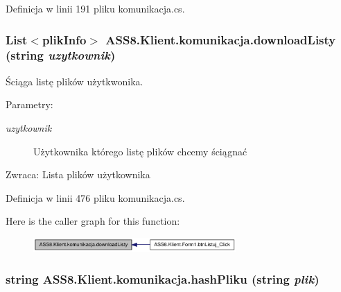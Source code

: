 Definicja w linii 191 pliku komunikacja.cs.\hypertarget{a00013_9ca2f36e9df9288ff32c44e789b0e576}{
\subsubsection[{downloadListy}]{\setlength{\rightskip}{0pt plus 5cm}List$<${\bf plikInfo}$>$ ASS8.Klient.komunikacja.downloadListy (string {\em uzytkownik})}}
\label{d7/dd4/a00013_9ca2f36e9df9288ff32c44e789b0e576}


Ściąga listę plików użytkwonika. 

\begin{Desc}
\item[Parametry:]
\begin{description}
\item[{\em uzytkownik}]Użytkownika którego listę plików chcemy ściągnać\end{description}
\end{Desc}
\begin{Desc}
\item[Zwraca:]Lista plików użytkownika\end{Desc}


Definicja w linii 476 pliku komunikacja.cs.

Here is the caller graph for this function:\nopagebreak
\begin{figure}[H]
\begin{center}
\leavevmode
\includegraphics[width=220pt]{d7/dd4/a00013_9ca2f36e9df9288ff32c44e789b0e576_icgraph}
\end{center}
\end{figure}
\hypertarget{a00013_d35eb35f48583fef5bf19cb2a0b2c9c5}{
\subsubsection[{hashPliku}]{\setlength{\rightskip}{0pt plus 5cm}string ASS8.Klient.komunikacja.hashPliku (string {\em plik})}}
\label{d7/dd4/a00013_d35eb35f48583fef5bf19cb2a0b2c9c5}


